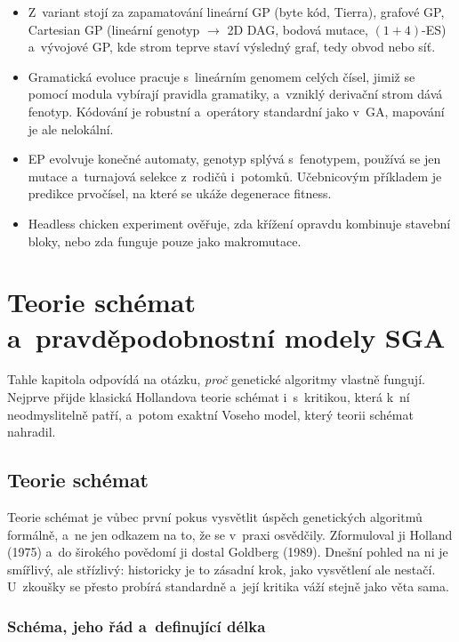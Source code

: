 \documentclass[11pt,a4paper]{article}
\theoremstyle{definition}
\begin{document}
\begin{itemize}
  na smysluplné programy.
\item Z~variant stojí za zapamatování lineární GP (byte kód, Tierra), grafové GP, Cartesian GP
  (lineární genotyp $\to$ 2D DAG, bodová mutace, $(1+4)$-ES) a~vývojové GP, kde strom teprve
  staví výsledný graf, tedy obvod nebo síť.
\item Gramatická evoluce pracuje s~lineárním genomem celých čísel, jimiž se pomocí modula
  vybírají pravidla gramatiky, a~vzniklý derivační strom dává fenotyp. Kódování je robustní
  a~operátory standardní jako v~GA, mapování je ale nelokální.
\item EP evolvuje konečné automaty, genotyp splývá s~fenotypem, používá se jen mutace
  a~turnajová selekce z~rodičů i~potomků. Učebnicovým příkladem je predikce prvočísel, na
  které se ukáže degenerace fitness.
\item Headless chicken experiment ověřuje, zda křížení opravdu kombinuje stavební bloky, nebo
  zda funguje pouze jako makromutace.
\end{itemize}

\section{Teorie schémat a~pravděpodobnostní modely SGA}
\label{sec:schemata}

Tahle kapitola odpovídá na otázku, \emph{proč} genetické algoritmy vlastně fungují.
Nejprve přijde klasická Hollandova teorie schémat i~s~kritikou, která k~ní neodmyslitelně
patří, a~potom exaktní Voseho model, který teorii schémat nahradil.

\subsection{Teorie schémat}
\label{ssec:teorie-schemat}

Teorie schémat je vůbec první pokus vysvětlit úspěch genetických algoritmů formálně, a~ne
jen odkazem na to, že se v~praxi osvědčily. Zformuloval ji Holland (1975) a~do širokého
povědomí ji dostal Goldberg (1989). Dnešní pohled na ni je smířlivý, ale střízlivý:
historicky je to zásadní krok, jako vysvětlení ale nestačí. U~zkoušky se přesto probírá
standardně a~její kritika váží stejně jako věta sama.

\subsubsection{Schéma, jeho řád a~definující délka}
\end{document}
